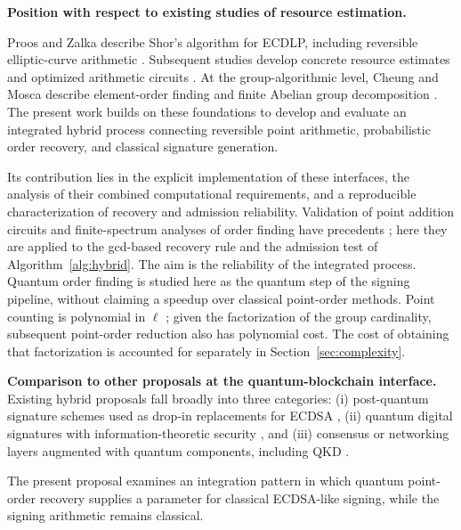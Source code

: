 \textbf{Position with respect to existing studies of resource estimation.}
\begin{revision}
Proos and Zalka describe Shor's algorithm for ECDLP, including reversible elliptic-curve arithmetic \cite{ProosZalka2003}. Subsequent studies develop concrete resource estimates and optimized arithmetic circuits \cite{Roetteler2017,Haner2020,Litinski2023}. At the group-algorithmic level, Cheung and Mosca describe element-order finding and finite Abelian group decomposition \cite{CheungMosca2001}. The present work builds on these foundations to develop and evaluate an integrated hybrid process connecting reversible point arithmetic, probabilistic order recovery, and classical signature generation.

Its contribution lies in the explicit implementation of these interfaces, the analysis of their combined computational requirements, and a reproducible characterization of recovery and admission reliability. Validation of point addition circuits and finite-spectrum analyses of order finding have precedents \cite{Papa2025Validation,Ekera2022OrderFinding}; here they are applied to the gcd-based recovery rule and the admission test of Algorithm~\ref{alg:hybrid}. The aim is the reliability of the integrated process. Quantum order finding is studied here as the quantum step of the signing pipeline, without claiming a speedup over classical point-order methods. Point counting is polynomial in $\ell$ \cite{Schoof1985}; given the factorization of the group cardinality, subsequent point-order reduction also has polynomial cost. The cost of obtaining that factorization is accounted for separately in Section~\ref{sec:complexity}.
\end{revision}


\textbf{Comparison to other proposals at the quantum-blockchain interface.} Existing hybrid proposals fall broadly into three categories: (i) post-quantum signature schemes used as drop-in replacements for ECDSA \cite{FernandezCarames2020, Aggarwal2018, Allende2023}, (ii) quantum digital signatures with information-theoretic security \cite{Gottesman2001, Amiri2016, Wallden2015}, and (iii) consensus or networking layers augmented with quantum components, including QKD \cite{Kappert2021, Pirandola2020}. \begin{revision}The present proposal examines an integration pattern in which quantum point-order recovery supplies a parameter for classical ECDSA-like signing, while the signing arithmetic remains classical.
\end{revision} 

